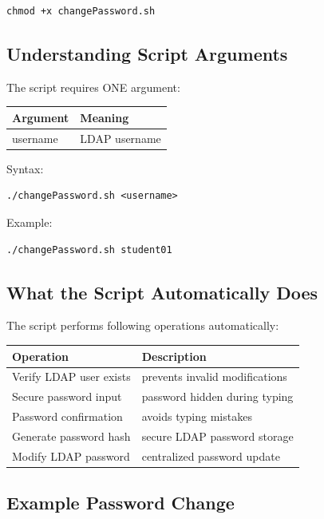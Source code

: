 \documentclass[11pt]{article}
\begin{document}
\begin{verbatim}
chmod +x changePassword.sh
\end{verbatim}
\subsection{Understanding Script Arguments}
\label{sec:orgd2c9c9c}

The script requires ONE argument:

\begin{center}
\begin{tabular}{ll}
Argument & Meaning\\
\hline
username & LDAP username\\
\end{tabular}
\end{center}

Syntax:

\begin{verbatim}
./changePassword.sh <username>
\end{verbatim}

Example:

\begin{verbatim}
./changePassword.sh student01
\end{verbatim}
\subsection{What the Script Automatically Does}
\label{sec:orgaa84716}

The script performs following operations automatically:

\begin{center}
\begin{tabular}{ll}
Operation & Description\\
\hline
Verify LDAP user exists & prevents invalid modifications\\
Secure password input & password hidden during typing\\
Password confirmation & avoids typing mistakes\\
Generate password hash & secure LDAP password storage\\
Modify LDAP password & centralized password update\\
\end{tabular}
\end{center}
\subsection{Example Password Change}
\label{sec:orgbcf0c19}
\end{document}
